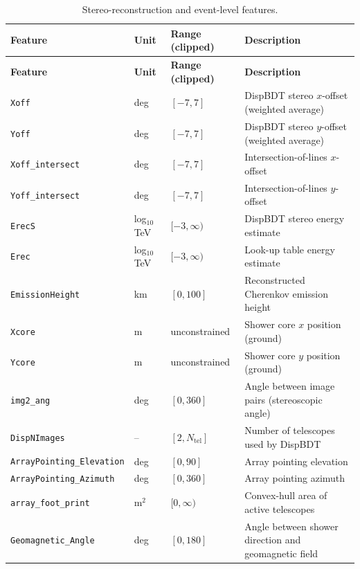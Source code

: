 \documentclass[12pt]{article}
\begin{document}
\begin{longtable}{lll p{5.5cm}}
\caption{Stereo-reconstruction and event-level features.} \label{tab:features-stereo} \\
\hline
\textbf{Feature} & \textbf{Unit} & \textbf{Range (clipped)} & \textbf{Description} \\
\hline
\endfirsthead
\hline
\textbf{Feature} & \textbf{Unit} & \textbf{Range (clipped)} & \textbf{Description} \\
\hline
\endhead
\hline
\endfoot
\texttt{Xoff} & deg & $[-7,7]$ & DispBDT stereo $x$-offset (weighted average) \\
\texttt{Yoff} & deg & $[-7,7]$ & DispBDT stereo $y$-offset (weighted average) \\
\texttt{Xoff\_intersect} & deg & $[-7,7]$ & Intersection-of-lines $x$-offset \\
\texttt{Yoff\_intersect} & deg & $[-7,7]$ & Intersection-of-lines $y$-offset \\
\texttt{ErecS} & log$_{10}$ TeV & $[-3,\infty)$ & DispBDT stereo energy estimate \\
\texttt{Erec} & log$_{10}$ TeV & $[-3,\infty)$ & Look-up table energy estimate \\
\texttt{EmissionHeight} & km & $[0,100]$ & Reconstructed Cherenkov emission height \\
\texttt{Xcore} & m & unconstrained & Shower core $x$ position (ground) \\
\texttt{Ycore} & m & unconstrained & Shower core $y$ position (ground) \\
\texttt{img2\_ang} & deg & $[0,360]$ & Angle between image pairs (stereoscopic angle) \\
\texttt{DispNImages} & -- & $[2, N_\mathrm{tel}]$ & Number of telescopes used by DispBDT \\
\texttt{ArrayPointing\_Elevation} & deg & $[0,90]$ & Array pointing elevation \\
\texttt{ArrayPointing\_Azimuth} & deg & $[0,360]$ & Array pointing azimuth \\
\texttt{array\_foot\_print} & m$^2$ & $[0,\infty)$ & Convex-hull area of active telescopes \\
\texttt{Geomagnetic\_Angle} & deg & $[0,180]$ & Angle between shower direction and geomagnetic field \\
\end{longtable}
\end{document}
